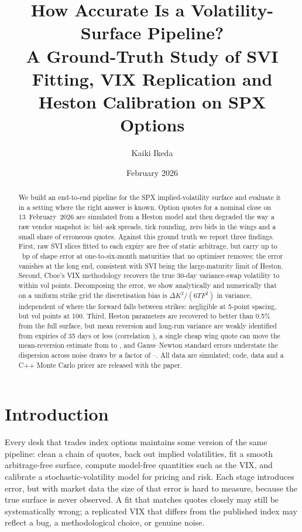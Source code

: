 \documentclass[11pt]{article}
\title{\textbf{How Accurate Is a Volatility-Surface Pipeline?}\\[2pt]
\large A Ground-Truth Study of SVI Fitting, VIX Replication and Heston Calibration on SPX Options}
\author{Kaiki Ikeda}
\date{February 2026}
\theoremstyle{remark}
\newcommand{\dK}{\Delta K}
\begin{document}
\maketitle

\begin{abstract}
\noindent
We build an end-to-end pipeline for the SPX implied-volatility surface and evaluate it in a setting where the right answer is known.
Option quotes for a nominal close on 13~February~2026 are simulated from a Heston model and then degraded the way a raw vendor snapshot is: bid--ask spreads, tick rounding, zero bids in the wings and a small share of erroneous quotes.
Against this ground truth we report three findings.
First, raw SVI slices fitted to each expiry are free of static arbitrage, but carry up to \SVIRmseMax~bp of shape error at one-to-six-month maturities that no optimiser removes; the error vanishes at the long end, consistent with SVI being the large-maturity limit of Heston.
Second, Cboe's VIX methodology recovers the true 30-day variance-swap volatility to within \VIXErrAbs{} vol points.
Decomposing the error, we show analytically and numerically that on a uniform strike grid the discretisation bias is $\dK^2/(6TF^2)$ in variance, independent of where the forward falls between strikes: negligible at 5-point spacing, but \ADiscHundredAbs{} vol points at 100.
Third, Heston parameters are recovered to better than 0.5\% from the full surface, but mean reversion and long-run variance are weakly identified from expiries of 35 days or less (correlation \BCorrKTShort), a single cheap wing quote can move the mean-reversion estimate from \ODropKappa{} to \OKappa, and Gauss--Newton standard errors understate the dispersion across noise draws by a factor of \BRatioMinFull--\BRatioMaxShort.
All data are simulated; code, data and a C++ Monte Carlo pricer are released with the paper.
\end{abstract}

\section{Introduction}

Every desk that trades index options maintains some version of the same pipeline: clean a chain of quotes, back out implied volatilities, fit a smooth arbitrage-free surface, compute model-free quantities such as the VIX, and calibrate a stochastic-volatility model for pricing and risk.
Each stage introduces error, but with market data the size of that error is hard to measure, because the true surface is never observed.
A fit that matches quotes closely may still be systematically wrong; a replicated VIX that differs from the published index may reflect a bug, a methodological choice, or genuine noise.
\end{document}

